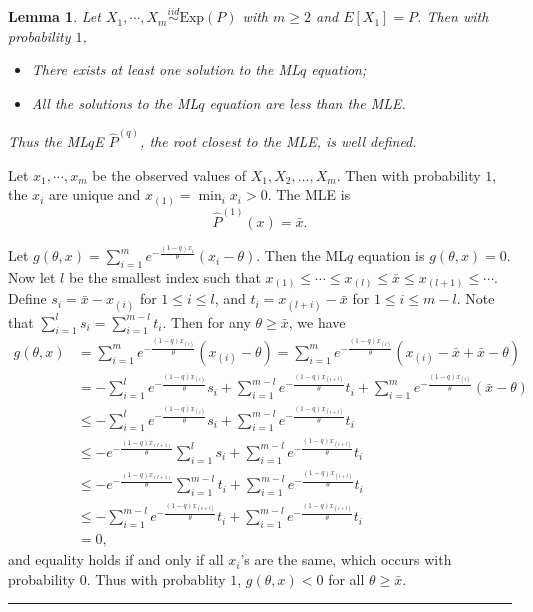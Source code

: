 \documentclass[a4paper]{article}
\newenvironment{proof}{{\bf Proof:  }}{\hfill\rule{2mm}{2mm}}
\newtheorem{lemma}[fact]{Lemma}
\renewcommand{\hat}{\widehat}
\begin{document}
\begin{lemma}
\label{lemma:LqlMLE}
Let $X_1, \cdots, X_m \stackrel{iid}{\sim} \mathrm{Exp}(P)$ with $m \ge 2$ and $E[X_1] = P$. Then with probability $1$,
\begin{itemize}
\item There exists at least one solution to the ML$q$ equation;
\item All the solutions to the ML$q$ equation are less than the MLE.
\end{itemize}
Thus the ML$q$E $\hat{P}^{(q)}$, the root closest to the MLE, is well defined.
\end{lemma}
\begin{proof}
Let $x_1, \cdots, x_m$ be the observed values of $X_1, X_2, \dots, X_m$. Then with probability $1$, the $x_i$ are unique and $x_{(1)} = \min_{i} x_i > 0$. The MLE is
\[
	\hat{P}^{(1)}(x) = \bar{x}.
\]

Let $g(\theta, x) = \sum_{i=1}^m e^{-\frac{(1-q)x_i}{\theta}}(x_i - \theta)$. Then the ML$q$ equation is $g(\theta, x) = 0$. Now let $l$ be the smallest index such that $x_{(1)} \le \cdots \le x_{(l)} \le \bar{x} \le x_{(l+1)} \le \cdots$. Define $s_i = \bar{x} - x_{(i)}$ for $1 \le i \le l$, and $t_{i} = x_{(l+i)} - \bar{x}$ for $1 \le i \le m - l$. Note that $\sum_{i=1}^l s_i = \sum_{i=1}^{m-l} t_i$. Then for any $\theta \ge \bar{x}$, we have
\begin{align*}
g(\theta, x) & = \sum_{i=1}^m e^{-\frac{(1-q)x_{(i)}}{\theta}}(x_{(i)} - \theta)
= \sum_{i=1}^m e^{-\frac{(1-q)x_{(i)}}{\theta}}(x_{(i)} - \bar{x} + \bar{x} - \theta) \\
& = - \sum_{i=1}^l e^{-\frac{(1-q)x_{(i)}}{\theta}}s_i
+ \sum_{i=1}^{m-l} e^{-\frac{(1-q)x_{(i+l)}}{\theta}}t_i
+ \sum_{i=1}^m e^{-\frac{(1-q)x_{(i)}}{\theta}}(\bar{x} - \theta)\\
& \le - \sum_{i=1}^l e^{-\frac{(1-q)x_{(i)}}{\theta}}s_i
+ \sum_{i=1}^{m-l} e^{-\frac{(1-q)x_{(i+l)}}{\theta}}t_i \\
& \le - e^{-\frac{(1-q)x_{(l+1)}}{\theta}} \sum_{i=1}^l s_i
+ \sum_{i=1}^{m-l} e^{-\frac{(1-q)x_{(i+l)}}{\theta}}t_i \\
& \le - e^{-\frac{(1-q)x_{(l+1)}}{\theta}} \sum_{i=1}^{m-l} t_i
+ \sum_{i=1}^{m-l} e^{-\frac{(1-q)x_{(i+l)}}{\theta}}t_i \\
& \le - \sum_{i=1}^{m-l} e^{-\frac{(1-q)x_{(i+l)}}{\theta}}t_i
+ \sum_{i=1}^{m-l} e^{-\frac{(1-q)x_{(i+l)}}{\theta}}t_i\\
& = 0,
\end{align*}
and equality holds if and only if all $x_i$'s are the same, which occurs with probability $0$. Thus with probablity $1$, $g(\theta, x) < 0$ for all $\theta \ge \bar{x}$.


\end{proof}
\end{document}
